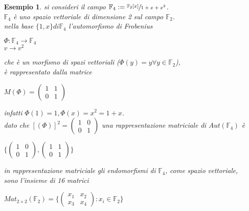 \documentclass[a4paper,12pt]{article}
\theoremstyle{def}
\theoremstyle{prop}
\theoremstyle{esempio}
\newtheorem*{example}{Esempio}
\theoremstyle{dimostrazione}
\theoremstyle{teo}
\theoremstyle{osservazione}
\begin{document}
\newpage
\begin{example}
	si consideri il campo \(\mathbb{F}_4 := \sfrac{\mathbb{F}_2[x]}{1 + x + x^2}\).\\
	\(\mathbb{F}_4\) è uno spazio vettoriale di dimensione 2 sul campo \(\mathbb{F}_2\).\\
	nella base \(\{1, x\} di \mathbb{F}_4\) l'automorfismo di Frobenius 
	\begin{center}
		\(\Phi : \mathbb{F}_4 \rightarrow \mathbb{F}_4\)\\
		\(v \rightarrow v^2\)
	\end{center}
	che è un morfismo di spazi vettoriali (\(\Phi(y) = y \forall y \in \mathbb{F}_2\)),\\
	è rappresentato dalla matrice
	\begin{center}
		\(M(\Phi) = \begin{pmatrix}
			1 & 1  \\
			0 & 1
		\end{pmatrix}\)
	\end{center}
	infatti \(\Phi(1) = 1, \Phi(x) = x^2 = 1 + x\).\\
	dato che \([(\Phi)]^2 = \begin{pmatrix}
		1 & 0  \\
		0 & 1
	\end{pmatrix}\) una rappresentazione matriciale di \(Aut(\mathbb{F}_4)\) è\\
	\begin{center}
		\(\{\begin{pmatrix}
			1 & 0  \\
			0 & 1
		\end{pmatrix},
		\begin{pmatrix}
			1 & 1  \\
			0 & 1
		\end{pmatrix}\}\)
	\end{center}
	in rappresentazione matriciale gli endomorfismi di \(\mathbb{F}_4\), come spazio vettoriale,\\
	sono l'insieme di 16 matrici
	\begin{center}
		\(Mat_{2 \times 2}(\mathbb{F}_2) = \{
		\begin{pmatrix}
			x_1 & x_2  \\
			x_3 & x_4
		\end{pmatrix} : 
		x_i \in \mathbb{F}_2\}\)	
	\end{center}
\end{example}
\end{document}
